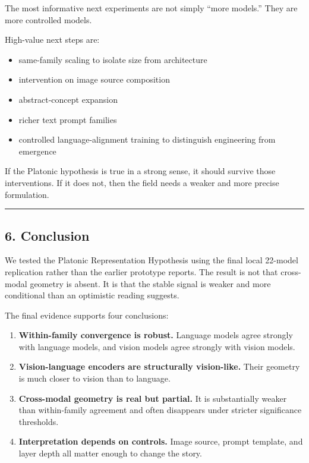 \documentclass[
]{article}
\providecommand{\tightlist}{%
  \setlength{\itemsep}{0pt}\setlength{\parskip}{0pt}}
\begin{document}
The most informative next experiments are not simply ``more models.''
They are more controlled models.

High-value next steps are:

\begin{itemize}
\tightlist
\item
  same-family scaling to isolate size from architecture
\item
  intervention on image source composition
\item
  abstract-concept expansion
\item
  richer text prompt families
\item
  controlled language-alignment training to distinguish engineering from
  emergence
\end{itemize}

If the Platonic hypothesis is true in a strong sense, it should survive
those interventions. If it does not, then the field needs a weaker and
more precise formulation.

\begin{center}\rule{0.5\linewidth}{0.5pt}\end{center}

\subsection{6. Conclusion}\label{conclusion}

We tested the Platonic Representation Hypothesis using the final local
22-model replication rather than the earlier prototype reports. The
result is not that cross-modal geometry is absent. It is that the stable
signal is weaker and more conditional than an optimistic reading
suggests.

The final evidence supports four conclusions:

\begin{enumerate}
\def\labelenumi{\arabic{enumi}.}
\tightlist
\item
  \textbf{Within-family convergence is robust.} Language models agree
  strongly with language models, and vision models agree strongly with
  vision models.
\item
  \textbf{Vision-language encoders are structurally vision-like.} Their
  geometry is much closer to vision than to language.
\item
  \textbf{Cross-modal geometry is real but partial.} It is substantially
  weaker than within-family agreement and often disappears under
  stricter significance thresholds.
\item
  \textbf{Interpretation depends on controls.} Image source, prompt
  template, and layer depth all matter enough to change the story.
\end{enumerate}
\end{document}
